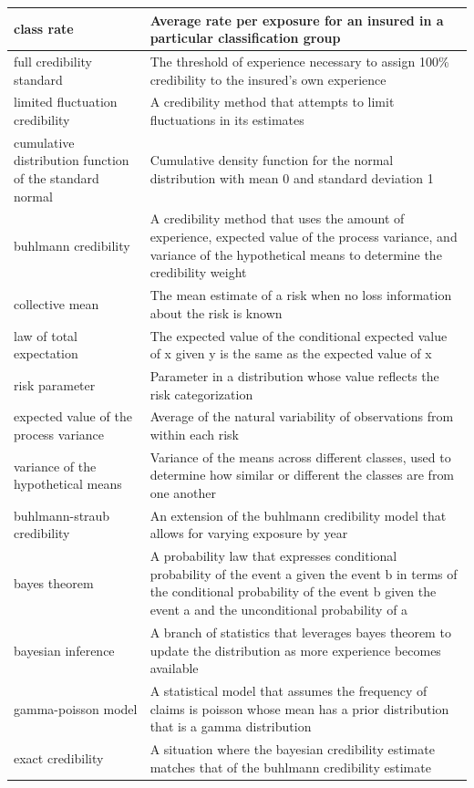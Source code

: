 \documentclass[
]{book}
\begin{document}
\begin{longtable}{>{\raggedright\arraybackslash}p{10em}|>{\raggedright\arraybackslash}p{30em}}
\hline
class rate & Average rate per exposure for an insured in a particular classification group\\
\hline
full credibility standard & The threshold of experience necessary to assign 100\% credibility to the insured's own experience\\
\hline
limited fluctuation credibility & A credibility method that attempts to limit fluctuations in its estimates\\
\hline
cumulative distribution function of the standard normal & Cumulative density function for the normal distribution with mean 0 and standard deviation 1\\
\hline
buhlmann credibility & A credibility method that uses the amount of experience, expected value of the process variance, and variance of the hypothetical means to determine the credibility weight\\
\hline
collective mean & The mean estimate of a risk when no loss information about the risk is known\\
\hline
law of total expectation & The expected value of the conditional expected value of x given y is the same as the expected value of x\\
\hline
risk parameter & Parameter in a distribution whose value reflects the risk categorization\\
\hline
expected value of the process variance & Average of the natural variability of observations from within each risk\\
\hline
variance of the hypothetical means & Variance of the means across different classes, used to determine how similar or different the classes are from one another\\
\hline
buhlmann-straub credibility & An extension of the buhlmann credibility model that allows for varying exposure by year\\
\hline
bayes theorem & A probability law that expresses conditional probability of the event a given the event b in terms of the conditional probability of the event b given the event a and the unconditional probability of a\\
\hline
bayesian inference & A branch of statistics that leverages bayes theorem to update the distribution as more experience becomes available\\
\hline
gamma-poisson model & A statistical model that assumes the frequency of claims is poisson whose mean has a prior distribution that is a gamma distribution\\
\hline
exact credibility & A situation where the bayesian credibility estimate matches that of the buhlmann credibility estimate\\

\end{longtable}
\end{document}
